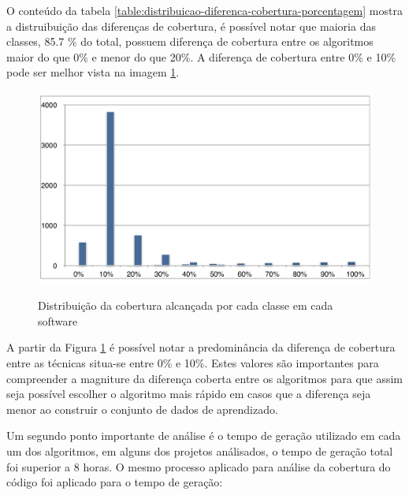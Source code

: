 \documentclass[
	12pt,				%
	oneside,			%
	a4paper,			%
	english,			%
	brazil				%
	]{abntex2ppgsi}
\begin{document}
O conteúdo da tabela \ref{table:distribuicao-diferenca-cobertura-porcentagem} mostra a distruibuição das diferenças de cobertura, é possível notar que maioria das classes, 85.7 \% do total, possuem diferença de cobertura entre os algoritmos maior do que 0\% e  menor do que 20\%. A diferença de cobertura entre 0\% e 10\% pode ser melhor vista na imagem \ref{fig:grafico_dif_cobertura}. 

\begin{figure}[H]%
	\centering
 	  \caption{Distribuição da cobertura alcançada por cada classe em cada software}
		\includegraphics[width=\textwidth]{grafico_dif_cobertura.png}
	\label{fig:grafico_dif_cobertura}
\end{figure}


A partir da Figura \ref{fig:grafico_dif_cobertura} é possível notar a predominância da diferença de cobertura entre as técnicas situa-se entre 0\% e 10\%. Estes valores são importantes para compreender a magniture da diferença coberta entre os algoritmos para que assim seja possível escolher o algoritmo mais rápido em casos que a diferença seja menor ao construir o conjunto de dados de aprendizado.

Um segundo ponto importante de análise é o tempo de geração utilizado em cada um dos algoritmos, em alguns dos projetos análisados, o tempo de geração total foi superior a 8 horas. O mesmo processo aplicado para análise da cobertura do código foi aplicado para o tempo de geração:\\
\end{document}
